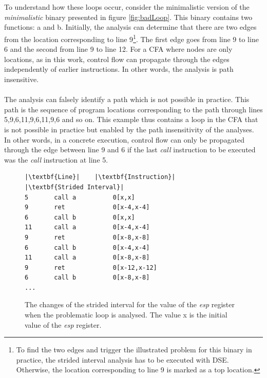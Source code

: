 \documentclass{kththesis}
\renewcommand{\it}[1]{\textit{#1}}
\begin{document}
\noindent
\\ \\
To understand how these loops occur, consider the minimalistic version of the \it{minimalistic} binary presented in figure \ref{fig:badLoop}. This binary contains two functions: a and b. Initially, the analysis can determine that there are two edges from the location corresponding to line 9\footnote{To find the two edges and trigger the illustrated problem for this binary in practice, the strided interval analysis has to be executed with DSE. Otherwise, the location corresponding to line 9 is marked as a top location.}. The first edge goes from line 9 to line 6 and the second from line 9 to line 12. For a CFA where nodes are only locations, as in this work, control flow can propagate through the edges independently of earlier instructions. In other words, the analysis is path insensitive.
\\ \\
The analysis can falsely identify a path which is not possible in practice. This path is the sequence of program locations corresponding to the path through lines 5,9,6,11,9,6,11,9,6 and so on. This example thus contains a loop in the CFA that is not possible in practice but enabled by the path insensitivity of the analyses. In other words, in a concrete execution, control flow can only be propagated through the edge between line 9 and 6 if the last \it{call} instruction to be executed was the \it{call} instruction at line 5.
\begin{figure}[!t]
    \centering
\begin{tcolorbox}
\begin{verbatim}
|\textbf{Line}|    |\textbf{Instruction}|     |\textbf{Strided Interval}|
5       call a          0[x,x]
9       ret             0[x-4,x-4]
6       call b          0[x,x]
11      call a          0[x-4,x-4]
9       ret             0[x-8,x-8]
6       call b          0[x-4,x-4]
11      call a          0[x-8,x-8]
9       ret             0[x-12,x-12]
6       call b          0[x-8,x-8]
...
\end{verbatim}
\end{tcolorbox}
\caption[The changes of the strided interval for the value of the \it{esp} register when the problematic loop is analysed.]{The changes of the strided interval for the value of the \it{esp} register when the problematic loop is analysed. The value x is the initial value of the \it{esp} register.}
    \label{fig:badLoopTrace}
\end{figure}
\end{document}
